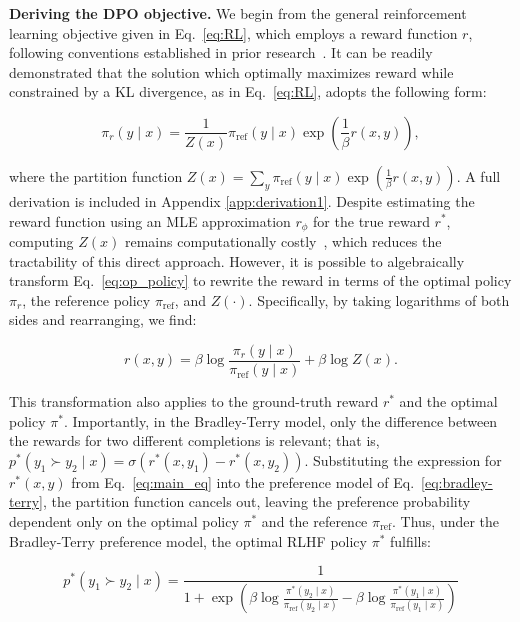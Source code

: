 \textbf{Deriving the DPO objective.} We begin from the general reinforcement learning objective given in Eq.~\ref{eq:RL}, which employs a reward function $r$, following conventions established in prior research~\citep{peters2007reinforcement, peng2019advantage, korbak2022reinforcement, go2023aligning}. It can be readily demonstrated that the solution which optimally maximizes reward while constrained by a KL divergence, as in Eq.~\ref{eq:RL}, adopts the following form:

\begin{equation}\label{eq:op_policy}
    \pi_r(y\mid x) = \frac{1}{Z(x)}\pi_\text{ref}(y\mid x)\exp\left(\frac{1}{\beta}r(x, y)\right),
\end{equation}

where the partition function $Z(x) =\sum_{y}\pi_\text{ref}(y\mid x)\exp\left(\frac{1}{\beta}r(x, y)\right)$. A full derivation is included in Appendix \ref{app:derivation1}. Despite estimating the reward function using an MLE approximation $r_\phi$ for the true reward $r^*$, computing $Z(x)$ remains computationally costly~\citep{korbak2022reinforcement, go2023aligning}, which reduces the tractability of this direct approach. However, it is possible to algebraically transform Eq.~\ref{eq:op_policy} to rewrite the reward in terms of the optimal policy $\pi_r$, the reference policy $\pi_\text{ref}$, and $Z(\cdot)$. Specifically, by taking logarithms of both sides and rearranging, we find:

\begin{equation}\label{eq:main_eq}
    r(x,y) =\beta \log \frac{\pi_r(y\mid x)}{\pi_\text{ref}(y\mid x)} + \beta \log Z(x).
\end{equation}

This transformation also applies to the ground-truth reward $r^*$ and the optimal policy $\pi^*$. Importantly, in the Bradley-Terry model, only the difference between the rewards for two different completions is relevant; that is, ${p^*(y_1 \succ y_2 \mid x) = \sigma(r^*(x, y_1) - r^*(x, y_2))}$. Substituting the expression for $r^*(x,y)$ from Eq.~\ref{eq:main_eq} into the preference model of Eq.~\ref{eq:bradley-terry}, the partition function cancels out, leaving the preference probability dependent only on the optimal policy $\pi^*$ and the reference $\pi_\text{ref}$. Thus, under the Bradley-Terry preference model, the optimal RLHF policy $\pi^*$ fulfills:

\begin{equation}\label{eq:objective}
    p^*(y_1\succ y_2 \mid x)=\frac{1}{1 + \exp\left(\beta \log \frac{\pi^*(y_2\mid x)}{\pi_\text{ref}(y_2\mid x)} - \beta \log \frac{\pi^*(y_1\mid x)}{\pi_\text{ref}(y_1\mid x)}\right)}
\end{equation}

